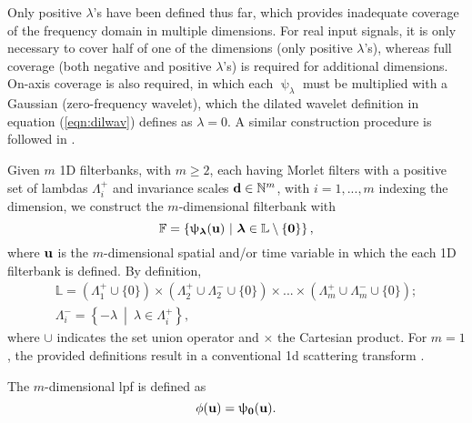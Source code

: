 Only positive $\lambda$'s have been defined thus far, which provides inadequate coverage of the frequency domain in multiple dimensions. For real input signals, it is only necessary to cover half of one of the dimensions (only positive $\lambda$'s), whereas full coverage (both negative and positive $\lambda$'s) is required for additional dimensions. On-axis coverage is also required, in which each $\uppsi_\lambda$ must be multiplied with a Gaussian (zero-frequency wavelet), which the dilated wavelet definition in equation (\ref{eqn:dilwav}) defines as $\lambda=0$. A similar construction procedure is followed in \citep{jointtfscattering2}.

Given $m$ 1D filterbanks, with $m \ge 2$, each having Morlet filters with a positive set of lambdas $\Lambda_i^+$ and invariance scales $\boldsymbol{\mathbf{d}} \in \mathbb{N}^m$, with $i = 1, ..., m$ indexing the dimension, we construct the $m$-dimensional filterbank with 
\begin{equation}
    \mathbb{F} = \left\{ \uppsi_{\boldsymbol{\mathbf{\lambda}} }(\mathbf{u}) \ \middle| \ \boldsymbol{\mathbf{\lambda}} \in \mathbb{L} \setminus \{\boldsymbol{\mathbf{0}}\} \right\},
\end{equation}
where $\boldsymbol{\mathbf{u}}$ is the $m$-dimensional spatial and/or time variable in which the each 1D filterbank is defined.  By definition, 
\begin{gather}
    \mathbb{L} = (\Lambda_1^+ \!\cup\! \{0\})\!\times\! (\Lambda_2^+ \!\cup\! \Lambda_2^- \!\cup \!\{0\}) \!\times\! ... \!\times\! (\Lambda_m^+ \!\cup\! \Lambda_m^- \!\cup\! \{0\}); \\
    \Lambda_i^- = \left\{-\lambda \ \middle| \ \lambda \in \Lambda_i^+\right\},
\end{gather}
where $\cup$ indicates the set union operator and $\times$ the Cartesian product. For $m=1$, the provided definitions result in a conventional \ac{1d} scattering transform \citep{1dscattering1}.

The $m$-dimensional \ac{lpf} is defined as 
\begin{equation}
    \phi(\boldsymbol{\mathbf{u}}) = \uppsi_{\boldsymbol{\mathbf{0}}}(\boldsymbol{\mathbf{u}}).
\end{equation}





